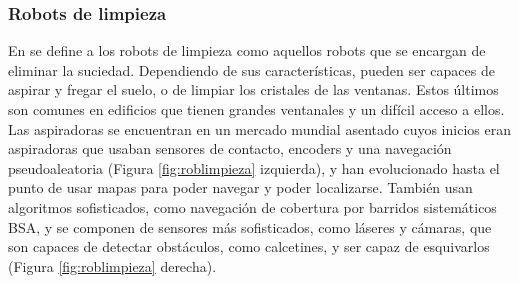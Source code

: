 \subsubsection{Robots de limpieza}
\label{subsubsec:robotlimpieza}

En \cite{plaza_robotica_servicio} se define a los robots de limpieza como aquellos robots que se encargan de eliminar la suciedad. Dependiendo de sus características, pueden ser capaces de aspirar y fregar el suelo, o de limpiar los cristales de las ventanas. Estos últimos son comunes en edificios que tienen grandes ventanales y un difícil acceso a ellos. Las aspiradoras se encuentran en un mercado mundial asentado cuyos inicios eran aspiradoras que usaban sensores de contacto, encoders y una navegación pseudoaleatoria (Figura \ref{fig:roblimpieza} izquierda), y han evolucionado hasta el punto de usar mapas para poder navegar y poder localizarse. También usan algoritmos sofisticados, como navegación de cobertura por barridos sistemáticos \acs{BSA}, y se componen de sensores más sofisticados, como láseres y cámaras, que son capaces de detectar obstáculos, como calcetines, y ser capaz de esquivarlos (Figura \ref{fig:roblimpieza} derecha).


